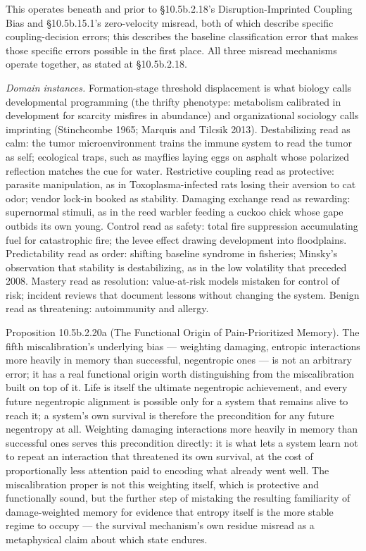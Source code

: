 \documentclass[
]{article}
\begin{document}
This operates beneath and prior to §10.5b.2.18's Disruption-Imprinted
Coupling Bias and §10.5b.15.1's zero-velocity misread, both of which
describe specific coupling-decision errors; this describes the baseline
classification error that makes those specific errors possible in the
first place. All three misread mechanisms operate together, as stated at
§10.5b.2.18.

\emph{Domain instances.} Formation-stage threshold displacement is what
biology calls developmental programming (the thrifty phenotype:
metabolism calibrated in development for scarcity misfires in abundance)
and organizational sociology calls imprinting (Stinchcombe 1965; Marquis
and Tilcsik 2013). Destabilizing read as calm: the tumor
microenvironment trains the immune system to read the tumor as self;
ecological traps, such as mayflies laying eggs on asphalt whose
polarized reflection matches the cue for water. Restrictive coupling
read as protective: parasite manipulation, as in Toxoplasma-infected
rats losing their aversion to cat odor; vendor lock-in booked as
stability. Damaging exchange read as rewarding: supernormal stimuli, as
in the reed warbler feeding a cuckoo chick whose gape outbids its own
young. Control read as safety: total fire suppression accumulating fuel
for catastrophic fire; the levee effect drawing development into
floodplains. Predictability read as order: shifting baseline syndrome in
fisheries; Minsky's observation that stability is destabilizing, as in
the low volatility that preceded 2008. Mastery read as resolution:
value-at-risk models mistaken for control of risk; incident reviews that
document lessons without changing the system. Benign read as
threatening: autoimmunity and allergy.

Proposition 10.5b.2.20a (The Functional Origin of Pain-Prioritized
Memory). The fifth miscalibration's underlying bias --- weighting
damaging, entropic interactions more heavily in memory than successful,
negentropic ones --- is not an arbitrary error; it has a real functional
origin worth distinguishing from the miscalibration built on top of it.
Life is itself the ultimate negentropic achievement, and every future
negentropic alignment is possible only for a system that remains alive
to reach it; a system's own survival is therefore the precondition for
any future negentropy at all. Weighting damaging interactions more
heavily in memory than successful ones serves this precondition
directly: it is what lets a system learn not to repeat an interaction
that threatened its own survival, at the cost of proportionally less
attention paid to encoding what already went well. The miscalibration
proper is not this weighting itself, which is protective and
functionally sound, but the further step of mistaking the resulting
familiarity of damage-weighted memory for evidence that entropy itself
is the more stable regime to occupy --- the survival mechanism's own
residue misread as a metaphysical claim about which state endures.
\end{document}
